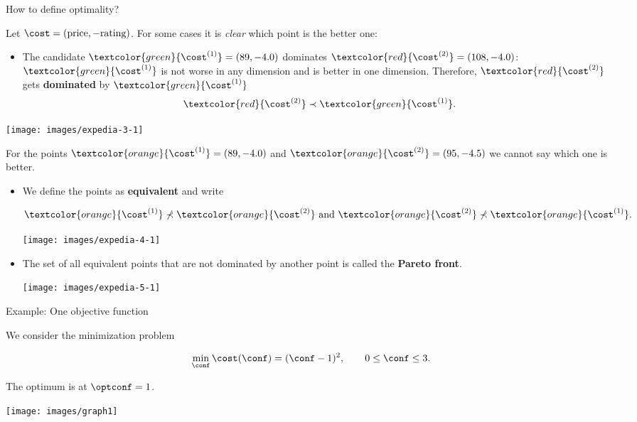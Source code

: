\begin{frame}[allowframebreaks]{How to define optimality?}

Let $\cost = (\text{price}, - \text{rating})$. For some cases it is \textit{clear} which point is the better one:

\begin{itemize}
    \item The candidate $\textcolor{green}{\cost^{(1)}} = \left(89, - 4.0\right)$ dominates $\textcolor{red}{\cost^{(2)}} = \left(108, - 4.0\right)$: $\textcolor{green}{\cost^{(1)}}$ is not worse in any dimension and is better in one dimension. Therefore, $\textcolor{red}{\cost^{(2)}}$ gets \textbf{dominated} by $\textcolor{green}{\cost^{(1)}}$
$$
\textcolor{red}{\cost^{(2)}} \prec \textcolor{green}{\cost^{(1)}}.
$$
\end{itemize}

\centering \texttt{[image: images/expedia-3-1]}

\framebreak

For the points $\textcolor{orange}{\cost^{(1)}} = \left(89, - 4.0\right)$ and $\textcolor{orange}{\cost^{(2)}} = \left(95, - 4.5\right)$ we cannot say which one is better.

\begin{itemize}
\item We define the points as \textbf{equivalent} and write

$$
\textcolor{orange}{\cost^{(1)}} \not\prec \textcolor{orange}{\cost^{(2)}} \text{ and } \textcolor{orange}{\cost^{(2)}} \not\prec \textcolor{orange}{\cost^{(1)}}.
$$

\centering \texttt{[image: images/expedia-4-1]}


\item The set of all equivalent points that are not dominated by another point is called the \textbf{Pareto front}.

\vspace*{0.3cm}

\centering \texttt{[image: images/expedia-5-1]}

\end{itemize}

\end{frame}

\begin{frame}{Example: One objective function}


We consider the minimization problem

$$
\min_{\conf} \cost(\conf) = (\conf - 1)^2, \qquad 0 \le \conf \le 3.
$$

The optimum is at $\optconf = 1$.

\vspace*{0.1cm}


\centering \texttt{[image: images/graph1]}


\end{frame}

